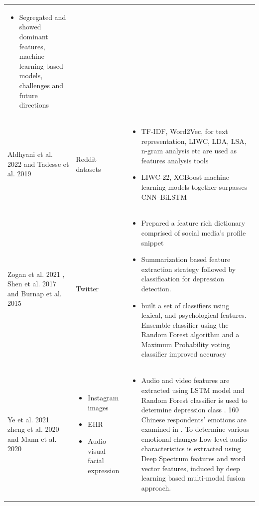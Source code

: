 \documentclass[sn-mathphys,Numbered]{sn-jnl}%
\theoremstyle{thmstyleone}%
\theoremstyle{thmstyletwo}%
\theoremstyle{thmstylethree}%
\begin{document}
\begin{table}[h!]
\begin{center}
\begin{flushleft}
\begin{tabular}{|p{2cm}|p{2cm}|p{8cm}|}
\begin{itemize}
\item Segregated and showed dominant features, machine learning-based models, challenges and future directions
\end{itemize}
\\ 
Aldhyani et al. 2022 \cite{aldhyani2022detecting} and Tadesse et al. 2019 \cite{tadesse2019detection}&
Reddit datasets &
\begin{itemize}
\item TF-IDF, Word2Vec, for text representation, LIWC, LDA, LSA, n-gram analysis etc are used as features analysis tools \cite{aldhyani2022detecting, tadesse2019detection}
\item LIWC-22, XGBoost machine learning models together surpasses CNN–BiLSTM \cite{aldhyani2022detecting}
\end{itemize}
\\
Zogan et al. 2021 \cite{zogan2021depressionnet}, Shen et al. 2017 \cite{shen2017depression} and Burnap et al. 2015  \cite{burnap2015machine}
& Twitter 
& 
\begin{itemize}
\item Prepared a feature rich dictionary comprised of social media's profile snippet \cite{shen2017depression}
\item Summarization based feature extraction strategy followed by classification for depression detection.\cite{zogan2021depressionnet}
\item built a set of classifiers using lexical, and psychological features. Ensemble classifier using the Random Forest algorithm and a Maximum Probability voting classifier improved accuracy  \cite{burnap2015machine}
\end{itemize} 
\\
Ye et al. 2021 \cite{ye2021multi} zheng et al. 2020 \cite{zheng2020development} and Mann et al. 2020 \cite{mann2020see} & 
\begin{itemize}
\item Instagram images \cite{mann2020see}
\item EHR \cite{zheng2020development}
\item Audio visual facial expression \cite{he2022deep, ye2021multi}
\end{itemize}
& \begin{itemize}
\item Audio and video features are extracted using LSTM model and Random Forest classifier is used to determine depression class \cite{he2022deep}. 160 Chinese respondents' emotions are examined in \cite{ye2021multi}. To determine various emotional changes Low-level audio characteristics is extracted using Deep Spectrum features and word vector features, induced by deep learning based multi-modal fusion approach. 

\end{itemize}
\end{tabular}
\end{flushleft}
\end{center}
\end{table}
\end{document}
